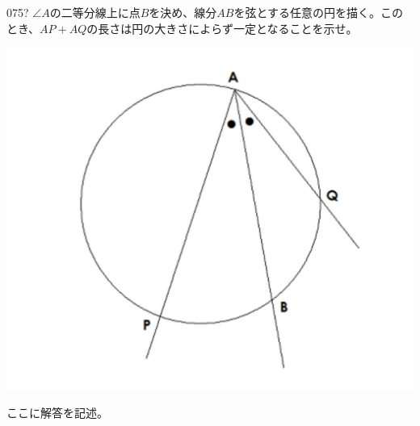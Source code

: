 \begin{thm}{075}{\hosi ?}{}
 $\angle{A}$の二等分線上に点$B$を決め、線分$AB$を弦とする任意の円を描く。このとき、$AP+AQ$の長さは円の大きさによらず一定となることを示せ。
 \begin{center}
  \includegraphics[bb=0 0 1080 909,width=0.9\linewidth]{../problems/Q_075/Q_075.jpg}
 \end{center}
\end{thm}

ここに解答を記述。